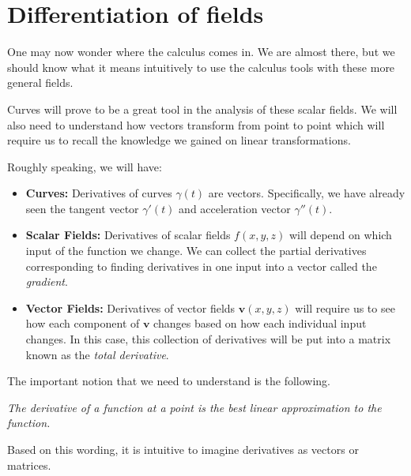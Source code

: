         \section{Differentiation of fields}
        One may now wonder where the calculus comes in.  We are almost there, but we should know what it means intuitively to use the calculus tools with these more general fields.
        
        Curves will prove to be a great tool in the analysis of these scalar fields.  We will also need to understand how vectors transform from point to point which will require us to recall the knowledge we gained on linear transformations.
        
        Roughly speaking, we will have:
        \begin{itemize}
            \item \textbf{Curves:} Derivatives of curves $\gamma(t)$ are vectors. Specifically, we have already seen the tangent vector $\gamma'(t)$ and acceleration vector $\gamma''(t)$.
            \item \textbf{Scalar Fields:} Derivatives of scalar fields $f(x,y,z)$ will depend on which input of the function we change.  We can collect the partial derivatives corresponding to finding derivatives in one input into a vector called the \emph{gradient}.
            \item \textbf{Vector Fields:} Derivatives of vector fields $\mathbf{v}(x,y,z)$ will require us to see how each component of $\mathbf{v}$ changes based on how each individual input changes.  In this case, this collection of derivatives will be put into a matrix known as the \emph{total derivative}.
        \end{itemize}
        
        \begin{remark}
        The important notion that we need to understand is the following.
        
        \emph{The derivative of a function at a point is the best linear approximation to the function.} 
        
        Based on this wording, it is intuitive to imagine derivatives as vectors or matrices.
        \end{remark}
        
